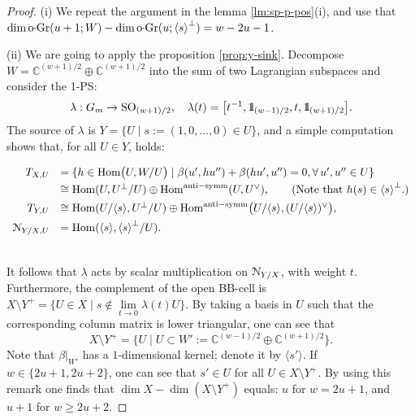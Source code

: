 \documentclass[11pt,reqno]{amsart}
\let\euf\EuScript
\let\mbb\mathbb
\let\nit\noindent
\let\lan\langle
\let\ran\rangle
\numberwithin{equation}{section}
\numberwithin{figure}{section}
\let\l\lambda
\let\sm\setminus
\let\ges\geqslant
\begin{document}
\begin{proof} 
(i) 
We repeat the argument in the lemma \ref{lm:sp-p-pos}(i), 
and use that $\dim{{\rm o{{{\vrule height2.75pt depth-2.35pt width2.3pt \kern1.7pt}}\!}Gr}}(u+1;W)-\dim{{\rm o{{{\vrule height2.75pt depth-2.35pt width2.3pt \kern1.7pt}}\!}Gr}}(u;{{\lan {s}\ran}}^\perp)=w-2u-1$. 

\nit(ii) We are going to apply the proposition \ref{prop:y-sink}. 
Decompose $W=\mbb C^{(w+1)/2}\oplus\mbb C^{(w+1)/2}$ into the sum 
of two Lagrangian subspaces and consider the 1-PS: 
$$
\l:G_m\to{{\rm SO}}_{(w+1)/2},\quad
\l(t)=\big[t^{-1},{{1\kern-0.57ex\rm l}}_{(w-1)/2},t,{{1\kern-0.57ex\rm l}}_{(w+1)/2}\big].
$$ 
The source of $\l$ is $Y=\{U\mid s:=(1,0,\ldots,0)\in U\}$, 
and a simple computation shows that, for all $U\in Y$, holds: 
\\[.5ex]\centerline{
$\begin{array}{rl}
T_{X,U}
&=
\{h\in{\mathop{\rm Hom}\nolimits}\big(U,W/U\big)\mid \beta(u',hu'')+\beta(hu',u'')=0,\forall\,u',u''\in U\}
\\[.5ex] 
&\cong{\mathop{\rm Hom}\nolimits}(U,U^\perp/U)\oplus{\mathop{\rm Hom}\nolimits}^{\rm anti-symm}(U,U^\vee),
\qquad\text{(Note that $h(s)\in{{\lan {s}\ran}}^\perp$.)}
\\[1ex] 
T_{Y,U}
&
\cong{\mathop{\rm Hom}\nolimits}(U/{{\lan {s}\ran}},U^\perp/U)\oplus
{\mathop{\rm Hom}\nolimits}^{\rm anti-symm}\big(U/{{\lan {s}\ran}},(U/{{\lan {s}\ran}})^\vee\big), 
\\[1ex] 
{{\euf N}}_{Y/X, U}
&={\mathop{\rm Hom}\nolimits}({{\lan {s}\ran}},{{\lan {s}\ran}}^\perp/U). 
\end{array}$
}\\[.5ex]
It follows that $\l$ acts by scalar multiplication on ${{\euf N}}_{Y/X}$, with weight $t$. 
Furthermore, the complement of the open BB-cell is 
$X\sm Y^+=\big\{U\in X\mid s\not\in\underset{t\to 0}{\lim}\l(t)U\big\}.$ 
By taking a basis in $U$ such that the corresponding column matrix 
is lower triangular, one can see that  
$$
X\sm Y^+=\{U\mid U\subset W':=\mbb C^{(w-1)/2}\oplus\mbb C^{(w+1)/2}\}.
$$ 
Note that $\beta|_{W'}$ has a $1$-dimensional kernel; denote it by ${{\lan {s'}\ran}}$. 
If $w\in\{2u+1,2u+2\}$, one can see that $s'\in U$ for all $U\in X\sm Y^+$. 
By using this remark one finds that $\dim X-\dim(X\sm Y^+)$ equals: 
$u$ for $w=2u+1$, and $u+1$ for $w\ges 2u+2$. 
\end{proof}
\end{document}
